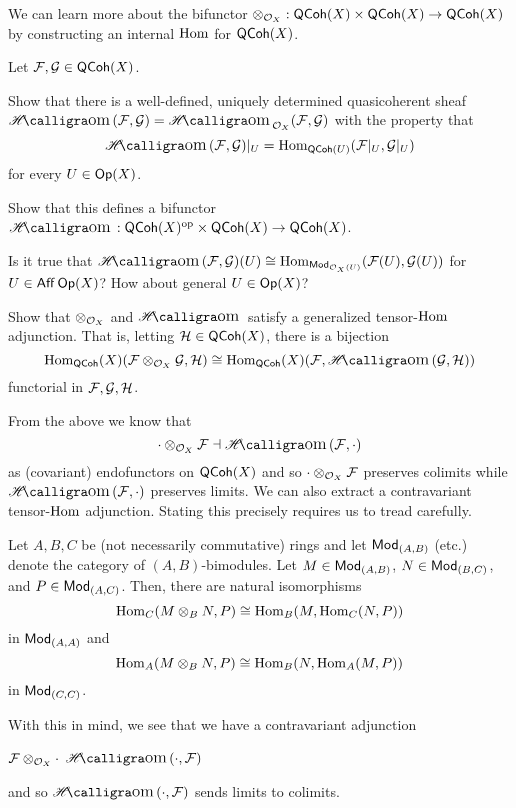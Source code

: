 \documentclass[11pt]{article}
\renewcommand{\F}{\mathcal{F}}
\newcommand{\G}{\mathcal{G}}
\begin{document}
We can learn more about the bifunctor $\otimes_{\mathcal{O}_X}: \operatorname{\mathsf{QCoh}}(X)\times\operatorname{\mathsf{QCoh}}(X)\to\operatorname{\mathsf{QCoh}}(X)$ by constructing an internal $\operatorname{Hom}$ for $\operatorname{\mathsf{QCoh}}(X)$. 

\begin{exercise}
Let $\F,\G\in\QCoh(X)$. 
\begin{enum}{\arabic}
\item Show that there is a well-defined, uniquely determined quasicoherent sheaf $\HHom(\F,\G)=\HHom_{\O_X}(\F,\G)$ with the property that 
$$\HHom(\F,\G)|_U=\Hom_{\QCoh(U)}(\F|_U,\G|_U)$$ 
for every $U\in\operatorname{\mathsf{Op}}(X)$.

\item Show that this defines a bifunctor $\HHom: \QCoh(X)^{\op}\times\QCoh(X)\to\QCoh(X)$.

\item Is it true that $\HHom(\F,\G)(U)\iso\Hom_{\Mod_{\O_X(U)}}(\F(U),\G(U))$ for $U\in\operatorname{\mathsf{Aff}}\operatorname{\mathsf{Op}}(X)$? How about general $U\in\operatorname{\mathsf{Op}}(X)$?

\item Show that $\otimes_{\mathcal{O}_X}$ and $\HHom$ satisfy a generalized tensor-$\operatorname{Hom}$ adjunction. That is, letting $\mathcal{H}\in\operatorname{\mathsf{QCoh}}(X)$, there is a bijection
$$\Hom_{\QCoh}(X)(\F\tensor_{\O_X}\G,\mc{H})\iso\Hom_{\QCoh}(X)(\F,\HHom(\G,\mc{H}))$$
functorial in $\F,\G,\mc{H}$.
\end{enum}
\end{exercise}

From the above we know that 
$$\cdot\tensor_{\O_X}\F\dashv\HHom(\F,\cdot)$$
as (covariant) endofunctors on $\operatorname{\mathsf{QCoh}}(X)$ and so $\cdot\tensor_{\O_X}\F$ preserves colimits while $\HHom(\F,\cdot)$ preserves limits. We can also extract a contravariant tensor-$\operatorname{Hom}$ adjunction. Stating this precisely requires us to tread carefully.

\begin{remark}
Let $A,B,C$ be (not necessarily commutative) rings and let $\operatorname{\mathsf{Mod}}_{(A,B)}$ (etc.) denote the category of $(A,B)$-bimodules. Let $M\in\operatorname{\mathsf{Mod}}_{(A,B)}$, $N\in\operatorname{\mathsf{Mod}}_{(B,C)}$, and $P\in\operatorname{\mathsf{Mod}}_{(A,C)}$. Then, there are natural isomorphisms 
$$\operatorname{Hom}_C(M\otimes_BN,P)\cong\operatorname{Hom}_B(M,\operatorname{Hom}_C(N,P))$$
in $\operatorname{\mathsf{Mod}}_{(A,A)}$ and
$$\operatorname{Hom}_A(M\otimes_BN,P)\cong\operatorname{Hom}_B(N,\operatorname{Hom}_A(M,P))$$
in $\operatorname{\mathsf{Mod}}_{(C,C)}$.
\end{remark} 

With this in mind, we see that we have a contravariant adjunction 
\begin{center}
$\F\tensor_{\O_X}\cdot$  $\HHom(\cdot,\F)$
\end{center}
and so $\HHom(\cdot,\F)$ sends limits to colimits.
\end{document}
